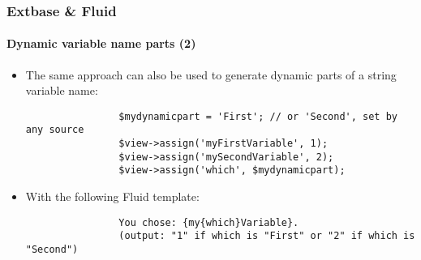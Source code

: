 \begin{frame}[fragile]
	\frametitle{Extbase \& Fluid}
	\framesubtitle{Dynamic variable name parts (2)}

	\lstset{basicstyle=\tiny\ttfamily}

	\begin{itemize}

		\item The same approach can also be used to generate dynamic parts of a string
			variable name:

			\begin{lstlisting}
				$mydynamicpart = 'First'; // or 'Second', set by any source
				$view->assign('myFirstVariable', 1);
				$view->assign('mySecondVariable', 2);
				$view->assign('which', $mydynamicpart);
			\end{lstlisting}

		\item With the following Fluid template:

			\begin{lstlisting}
				You chose: {my{which}Variable}.
				(output: "1" if which is "First" or "2" if which is "Second")
			\end{lstlisting}

	\end{itemize}

\end{frame}


